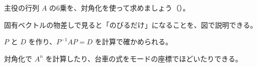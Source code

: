 \bkproblem 主役の行列 $A$ の6乗を、対角化を使って求めましょう\mbox{（）}。

\begin{furikaeri}
\begin{checklist}
\item 固有ベクトルの物差しで見ると「のびるだけ」になることを、図で説明できる。
\item $P$ と $D$ を作り、$P^{-1}AP=D$ を計算で確かめられる。
\item 対角化で $A^n$ を計算したり、台車の式をモードの座標でほどいたりできる。
\end{checklist}
\end{furikaeri}

